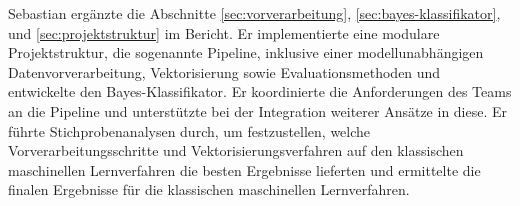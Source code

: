 \label{sec:sebastian}
Sebastian ergänzte die Abschnitte \ref{sec:vorverarbeitung}, \ref{sec:bayes-klassifikator}, und \ref{sec:projektstruktur} im Bericht. Er implementierte eine modulare Projektstruktur, die sogenannte \glqq Pipeline\grqq, inklusive einer modellunabhängigen Datenvorverarbeitung, Vektorisierung sowie Evaluationsmethoden und entwickelte den Bayes-Klassifikator. Er koordinierte die Anforderungen des Teams an die Pipeline und unterstützte bei der Integration weiterer Ansätze in diese. Er führte Stichprobenanalysen durch, um festzustellen, welche Vorverarbeitungsschritte und Vektorisierungsverfahren auf den klassischen maschinellen Lernverfahren die besten Ergebnisse lieferten und ermittelte die finalen Ergebnisse für die klassischen maschinellen Lernverfahren.
